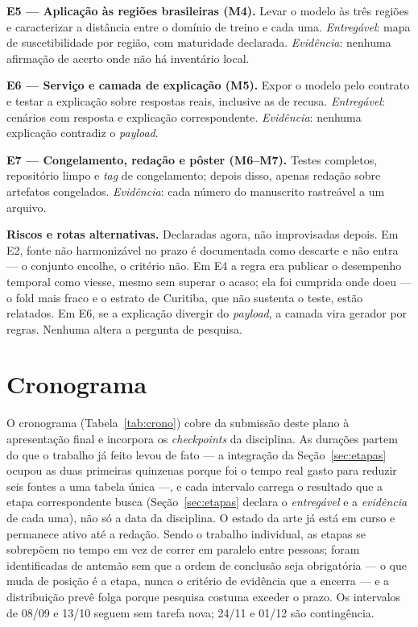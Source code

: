 \documentclass[conference]{IEEEtran}
\begin{document}
\textbf{E5 --- Aplicação às regiões brasileiras (M4).} Levar o modelo às três
regiões e caracterizar a distância entre o domínio de treino e cada uma.
\emph{Entregável}: mapa de suscetibilidade por região, com maturidade declarada.
\emph{Evidência}: nenhuma afirmação de acerto onde não há inventário local.

\textbf{E6 --- Serviço e camada de explicação (M5).} Expor o modelo pelo contrato
e testar a explicação sobre respostas reais, inclusive as de recusa.
\emph{Entregável}: cenários com resposta e explicação correspondente.
\emph{Evidência}: nenhuma explicação contradiz o \emph{payload}.

\textbf{E7 --- Congelamento, redação e pôster (M6--M7).} Testes completos,
repositório limpo e \emph{tag} de congelamento; depois disso, apenas redação
sobre artefatos congelados. \emph{Evidência}: cada número do manuscrito
rastreável a um arquivo.

\textbf{Riscos e rotas alternativas.} Declaradas agora, não improvisadas depois.
Em E2, fonte não harmonizável no prazo é documentada como descarte e não entra ---
o conjunto encolhe, o critério não. Em E4 a regra era publicar o desempenho
temporal como viesse, mesmo sem superar o acaso; ela foi cumprida onde doeu ---
o fold mais fraco e o estrato de Curitiba, que não sustenta o teste, estão
relatados. Em E6, se a explicação divergir do
\emph{payload}, a camada vira gerador por regras. Nenhuma altera a pergunta de
pesquisa.

\section{Cronograma}
\label{sec:crono}

O cronograma (Tabela~\ref{tab:crono}) cobre da submissão deste plano à
apresentação final e incorpora os \emph{checkpoints} da disciplina. As
durações partem do que o trabalho já feito levou de fato --- a integração da
Seção~\ref{sec:etapas} ocupou as duas primeiras quinzenas porque foi o tempo
real gasto para reduzir seis fontes a uma tabela única ---, e cada intervalo
carrega o resultado que a etapa correspondente busca (Seção~\ref{sec:etapas}
declara o \emph{entregável} e a \emph{evidência} de cada uma), não só a data
da disciplina. O estado da
arte já está em curso e permanece ativo até a redação. Sendo o trabalho
individual, as etapas se sobrepõem no tempo em vez de correr em paralelo entre
pessoas; foram identificadas de antemão sem que a ordem de conclusão seja
obrigatória --- o que muda de posição é a etapa, nunca o critério de evidência
que a encerra --- e a distribuição prevê folga porque pesquisa costuma exceder o
prazo. Os intervalos de 08/09 e 13/10 seguem sem tarefa nova; 24/11 e 01/12 são
contingência.
\end{document}
